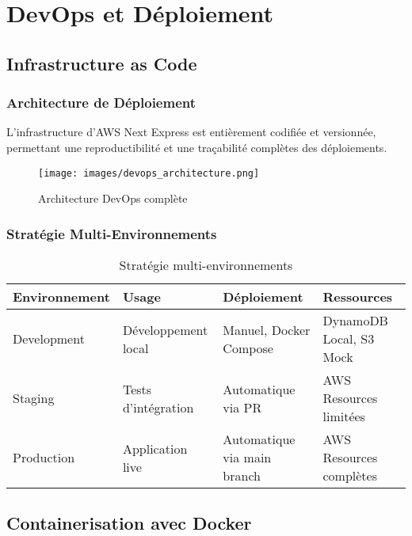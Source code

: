\chapter{DevOps et Déploiement}

\section{Infrastructure as Code}

\subsection{Architecture de Déploiement}

L'infrastructure d'AWS Next Express est entièrement codifiée et versionnée, permettant une reproductibilité et une traçabilité complètes des déploiements.

\begin{figure}[H]
    \centering
    \texttt{[image: images/devops\_architecture.png]}
    \caption{Architecture DevOps complète}
    \label{fig:devops_architecture}
\end{figure}

\subsection{Stratégie Multi-Environnements}

\begin{table}[H]
    \centering
    \begin{tabularx}{\textwidth}{|l|X|X|X|}
        \hline
        \textbf{Environnement} & \textbf{Usage} & \textbf{Déploiement} & \textbf{Ressources} \\
        \hline
        Development & Développement local & Manuel, Docker Compose & DynamoDB Local, S3 Mock \\
        \hline
        Staging & Tests d'intégration & Automatique via PR & AWS Resources limitées \\
        \hline
        Production & Application live & Automatique via main branch & AWS Resources complètes \\
        \hline
    \end{tabularx}
    \caption{Stratégie multi-environnements}
    \label{tab:environments}
\end{table}

\section{Containerisation avec Docker}

